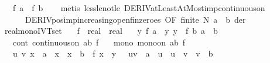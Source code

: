 \begin{isabellebody}
\ \ \ {\isachardoublequoteopen}f\ a\ {\isacharless}{\kern0pt}\ f\ b{\isachardoublequoteclose}\isanewline
%
\isadelimproof
\ \ %
\endisadelimproof
%
\isatagproof
{}\isamarkupfalse%
\ {\isacharparenleft}{\kern0pt}metis\ less{\isacharunderscore}{\kern0pt}le{\isacharunderscore}{\kern0pt}not{\isacharunderscore}{\kern0pt}le\ DERIV{\isacharunderscore}{\kern0pt}atLeastAtMost{\isacharunderscore}{\kern0pt}imp{\isacharunderscore}{\kern0pt}continuous{\isacharunderscore}{\kern0pt}on\isanewline
\ \ \ \ \ \ DERIV{\isacharunderscore}{\kern0pt}pos{\isacharunderscore}{\kern0pt}imp{\isacharunderscore}{\kern0pt}increasing{\isacharunderscore}{\kern0pt}open{\isacharunderscore}{\kern0pt}fin{\isacharunderscore}{\kern0pt}zeroes\ {\isacharbrackleft}{\kern0pt}OF\ {\isacartoucheopen}finite\ N{\isacartoucheclose}\ {\isacartoucheopen}a\ {\isacharless}{\kern0pt}\ b{\isacartoucheclose}{\isacharbrackright}{\kern0pt}\ der{\isacharparenright}{\kern0pt}%
\endisatagproof
{\isafoldproof}%
%
\isadelimproof
%
\endisadelimproof
%
\isadelimdocument
%
\endisadelimdocument
%
\isatagdocument
%
\isamarkuptrue%
%
\endisatagdocument
{\isafolddocument}%
%
\isadelimdocument
%
\endisadelimdocument
{}\isamarkupfalse%
\ real{\isacharunderscore}{\kern0pt}mono{\isacharunderscore}{\kern0pt}IVT{\isacharprime}{\kern0pt}{\isacharunderscore}{\kern0pt}set{\isacharcolon}{\kern0pt}\isanewline
\ \ \ f\ {\isacharcolon}{\kern0pt}{\isacharcolon}{\kern0pt}\ {\isachardoublequoteopen}real\ {\isasymRightarrow}\ real{\isachardoublequoteclose}\isanewline
\ \ \ y{\isacharcolon}{\kern0pt}\ {\isachardoublequoteopen}f\ a\ {\isasymle}\ y{\isachardoublequoteclose}\ {\isachardoublequoteopen}y\ {\isasymle}\ f\ b{\isachardoublequoteclose}\ {\isachardoublequoteopen}a\ {\isasymle}\ b{\isachardoublequoteclose}\isanewline
\ \ \ cont{\isacharcolon}{\kern0pt}\ {\isachardoublequoteopen}continuous{\isacharunderscore}{\kern0pt}on\ {\isacharbraceleft}{\kern0pt}a{\isachardot}{\kern0pt}{\isachardot}{\kern0pt}b{\isacharbraceright}{\kern0pt}\ f{\isachardoublequoteclose}\isanewline
\ \ \ mono{\isacharcolon}{\kern0pt}\ {\isachardoublequoteopen}mono{\isacharunderscore}{\kern0pt}on\ {\isacharbraceleft}{\kern0pt}a{\isachardot}{\kern0pt}{\isachardot}{\kern0pt}b{\isacharbraceright}{\kern0pt}\ f{\isachardoublequoteclose}\isanewline
\ \ \ {\isachardoublequoteopen}{\isasymexists}u\ v{\isachardot}{\kern0pt}\ {\isacharbraceleft}{\kern0pt}x\ {\isachardot}{\kern0pt}\ a\ {\isasymle}\ x\ {\isasymand}\ x\ {\isasymle}\ b\ {\isasymand}\ f\ x\ {\isacharequal}{\kern0pt}\ y\ {\isacharbraceright}{\kern0pt}\ {\isacharequal}{\kern0pt}\ {\isacharbraceleft}{\kern0pt}u{\isachardot}{\kern0pt}{\isachardot}{\kern0pt}v{\isacharbraceright}{\kern0pt}\ {\isasymand}\ a\ {\isasymle}\ u\ {\isasymand}\ u\ {\isasymle}\ v\ {\isasymand}\ v\ {\isasymle}\ b{\isachardoublequoteclose}\isanewline

\end{isabellebody}

